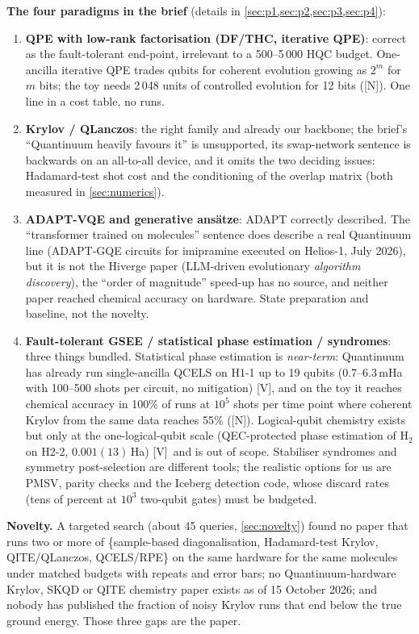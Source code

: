 \documentclass[11pt,a4paper]{article}
\newcommand{\lV}{\textcolor{keyblue}{[V]}}   %
\newcommand{\lN}{\textcolor{keyblue}{[N]}}   %
\begin{document}
\textbf{The four paradigms in the brief} (details in \cref{sec:p1,sec:p2,sec:p3,sec:p4}):
\begin{enumerate}
\item \textbf{QPE with low-rank factorisation (DF/THC, iterative QPE)}: correct as the fault-tolerant end-point, irrelevant to a 500--5\,000 HQC budget. One-ancilla iterative QPE trades qubits for coherent evolution growing as $2^{m}$ for $m$ bits; the toy needs 2\,048 units of controlled evolution for 12 bits (\lN). One line in a cost table, no runs.
\item \textbf{Krylov / QLanczos}: the right family and already our backbone; the brief's ``Quantinuum heavily favours it'' is unsupported, its swap-network sentence is backwards on an all-to-all device, and it omits the two deciding issues: Hadamard-test shot cost and the conditioning of the overlap matrix (both measured in \cref{sec:numerics}).
\item \textbf{ADAPT-VQE and generative ans\"atze}: ADAPT correctly described. The ``transformer trained on molecules'' sentence does describe a real Quantinuum line (ADAPT-GQE circuits for imipramine executed on Helios-1, July 2026), but it is not the Hiverge paper (LLM-driven evolutionary \emph{algorithm discovery}), the ``order of magnitude'' speed-up has no source, and neither paper reached chemical accuracy on hardware. State preparation and baseline, not the novelty.
\item \textbf{Fault-tolerant GSEE / statistical phase estimation / syndromes}: three things bundled. Statistical phase estimation is \emph{near-term}: Quantinuum has already run single-ancilla QCELS on H1-1 up to 19 qubits (0.7--6.3\,mHa with 100--500 shots per circuit, no mitigation) \lV, and on the toy it reaches chemical accuracy in 100\% of runs at $10^5$ shots per time point where coherent Krylov from the same data reaches 55\% (\lN). Logical-qubit chemistry exists but only at the one-logical-qubit scale (QEC-protected phase estimation of H$_2$ on H2-2, $0.001(13)$\,Ha) \lV\ and is out of scope. Stabiliser syndromes and symmetry post-selection are different tools; the realistic options for us are PMSV, parity checks and the Iceberg detection code, whose discard rates (tens of percent at $10^3$ two-qubit gates) must be budgeted.
\end{enumerate}

\textbf{Novelty.} A targeted search (about 45 queries, \cref{sec:novelty}) found no paper that runs two or more of \{sample-based diagonalisation, Hadamard-test Krylov, QITE/QLanczos, QCELS/RPE\} on the same hardware for the same molecules under matched budgets with repeats and error bars; no Quantinuum-hardware Krylov, SKQD or QITE chemistry paper exists as of 15 October 2026; and nobody has published the fraction of noisy Krylov runs that end below the true ground energy. Those three gaps are the paper.
\end{document}
